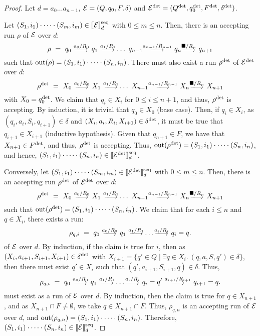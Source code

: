 \begin{proof}
	Let $d=a_0\ldots a_{n-1}$, $\mathcal{E} = (Q, q_0, F, \delta)$ and $\mathcal{E}^{{\operatorname{det}}} =
		(Q^{{\operatorname{det}}},q_0^{{\operatorname{det}}}, F^{{\operatorname{det}}}, \delta^{{\operatorname{det}}})$.

	Let $(S_1, i_1)\cdot \cdots \cdot(S_m, i_m) \in \llbracket\mathcal{E}\rrbracket^{\operatorname{seq}}_d$ with $0 \leq
		m \leq n$. Then, there is an accepting run $\rho$ of $\mathcal{E}$ over $d$:
	$$
		\rho \ = \ q_0 \ \longtrans{a_0 / R_0} \ q_1 \ \longtrans{a_1 / R_1}  \ldots \ q_{n-1} \longtrans{a_{n-1} / R_{n-1}} \ q_{n} \longtrans{\osymbol / R_n} \ q_{n+1}
	$$
	such that $\operatorname{out}(\rho) = (S_1, i_1)\cdot \cdots \cdot(S_n, i_n)$. There must
	also exist a run $\rho^{{\operatorname{det}}}$ of $\mathcal{E}^{{\operatorname{det}}}$ over $d$:
	$$
		\rho^{\odet} \ = \ X_0 \ \longtrans{a_0 / R_0} \ X_1 \ \longtrans{a_1 / R_1}  \ldots \ X_{n-1} \longtrans{a_{n-1} / R_{n-1}} \ X_{n} \longtrans{\osymbol / R_n} \ X_{n+1}
	$$
	with $X_0 = q_0^{{\operatorname{det}}}$. We claim that $q_i \in X_i$ for $0 \leq i \leq n +
		1$, and thus, $\rho^{{\operatorname{det}}}$ is accepting. By induction, it is trivial
		that $q_0 \in X_0$ (base case). Then, if $q_i \in X_i$, as $(q_i, a_i,
		S_i, q_{i+1}) \in \delta$ and $(X_i, a_i, R_i, X_{i+1}) \in
		\delta^{{\operatorname{det}}}$, it must be true that $q_{i+1} \in X_{i+1}$ (inductive
		hypothesis). Given that $q_{n+1} \in F$, we have that $X_{n+1} \in
		F^{{\operatorname{det}}}$, and thus, $\rho^{{\operatorname{det}}}$ is accepting. Thus,
		$\operatorname{out}(\rho^{{\operatorname{det}}}) = (S_1, i_1)\cdot \cdots \cdot(S_n, i_n)$, and
		hence, $(S_1, i_1)\cdot \cdots \cdot(S_n, i_n) \in
		\llbracket\mathcal{E}^{{\operatorname{det}}}\rrbracket^{\operatorname{seq}}_d$.

	Conversely, let $(S_1, i_1)\cdot \cdots \cdot(S_m, i_m) \in
		\llbracket\mathcal{E}^{{\operatorname{det}}}\rrbracket^{\operatorname{seq}}_d$ with $0 \leq m \leq n$. Then, there is an
		accepting run $\rho^{{\operatorname{det}}}$ of $\mathcal{E}^{{\operatorname{det}}}$ over $d$:
	$$
		\rho^{\odet} \ = \ X_0 \ \longtrans{a_0 / R_0} \ X_1 \ \longtrans{a_1 / R_1}  \ldots \ X_{n-1} \longtrans{a_{n-1} / R_{n-1}} \ X_{n} \longtrans{\osymbol / R_n} \ X_{n+1}
	$$
	such that $\operatorname{out}(\rho^{{\operatorname{det}}}) = (S_1, i_1)\cdot \cdots \cdot(S_n, i_n)$. We
	claim that for each $i \leq n$ and $q \in X_i$, there exists a run:
	$$
		\rho_{q,i} \ = \ q_0 \ \longtrans{a_0 / R_0} \ q_1 \ \longtrans{a_1 / R_1}  \ldots \longtrans{a_{i} / R_{i}} \ q_{i} = q.
	$$
	of $\mathcal{E}$ over $d$. By induction, if the claim is true for $i$, then as
	$(X_i, a_{i+1}, S_{i+1}, X_{i+1}) \in \delta^{{\operatorname{det}}}$ with $X_{i+1} = \{q'
	\in Q \mid \exists q \in X_i.\ (q, a, S, q') \in \delta\}$, then there must
	exist $q' \in X_{i}$ such that $(q', a_{i+1}, S_{i+1}, q) \in \delta$. Thus, 
	$$
		\rho_{q,i} \ = \ q_0 \ \longtrans{a_0 / R_0} \ q_1 \ \longtrans{a_1 / R_1}  \ldots \longtrans{a_{i} / R_{i}} \ q_{i} = q' \ \longtrans{a_{i+1} / R_{i+1}} \ q_{i+1} = q.
	$$
	must exist as a run of $\mathcal{E}$ over $d$. By induction, then the claim is true
	for $q \in X_{n+1}$, and as $X_{n+1} \cap F \neq \emptyset$, we take $q \in
	X_{n+1} \cap F$. Thus, $\rho_{q, n}$ is an accepting run of $\mathcal{E}$ over $d$,
	and $\operatorname{out}(\rho_{q, n}) = (S_1, i_1)\cdot \cdots \cdot(S_n, i_n)$.
	Therefore, $(S_1, i_1)\cdot \cdots \cdot(S_n, i_n) \in \llbracket\mathcal{E}\rrbracket^{\operatorname{seq}}_d$.
\end{proof}


